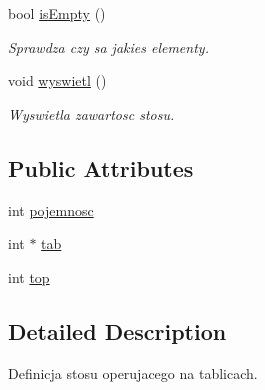 \begin{DoxyCompactItemize}
bool \hyperlink{class_stos__tab_ab4fef55704fd432bc4aa5241c91e661e}{is\-Empty} ()
\begin{DoxyCompactList}\small\item\em \-Sprawdza czy sa jakies elementy. \end{DoxyCompactList}\item 
void \hyperlink{class_stos__tab_a72a64e2c3fa075d9b2f6e17c02112b69}{wyswietl} ()
\begin{DoxyCompactList}\small\item\em \-Wyswietla zawartosc stosu. \end{DoxyCompactList}\end{DoxyCompactItemize}
\subsection*{\-Public \-Attributes}
\begin{DoxyCompactItemize}
\item 
int \hyperlink{class_stos__tab_aadc220182c86eac8973434301019d574}{pojemnosc}
\item 
int $\ast$ \hyperlink{class_stos__tab_aa553f36a0b665f6a2c1bf2912fdcdd3d}{tab}
\item 
int \hyperlink{class_stos__tab_ae4ed3f46c3bee53437c6b201a6e47c49}{top}
\end{DoxyCompactItemize}


\subsection{\-Detailed \-Description}
\-Definicja stosu operujacego na tablicach. 



